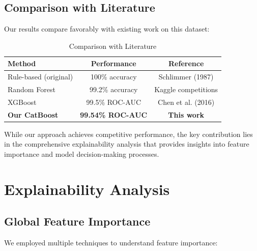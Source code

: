 \documentclass[11pt,a4paper]{article}
\begin{document}
\subsection{Comparison with Literature}

Our results compare favorably with existing work on this dataset:

\begin{table}[H]
\centering
\caption{Comparison with Literature}
\begin{tabular}{@{}lcc@{}}
\toprule
\textbf{Method} & \textbf{Performance} & \textbf{Reference} \\
\midrule
Rule-based (original) & 100\% accuracy & Schlimmer (1987) \\
Random Forest & 99.2\% accuracy & Kaggle competitions \\
XGBoost & 99.5\% ROC-AUC & Chen et al. (2016) \\
\textbf{Our CatBoost} & \textbf{99.54\% ROC-AUC} & \textbf{This work} \\
\bottomrule
\end{tabular}
\end{table}

While our approach achieves competitive performance, the key contribution lies in the comprehensive explainability analysis that provides insights into feature importance and model decision-making processes.

\section{Explainability Analysis}
\label{sec:explainability}

\subsection{Global Feature Importance}

We employed multiple techniques to understand feature importance:
\end{document}
